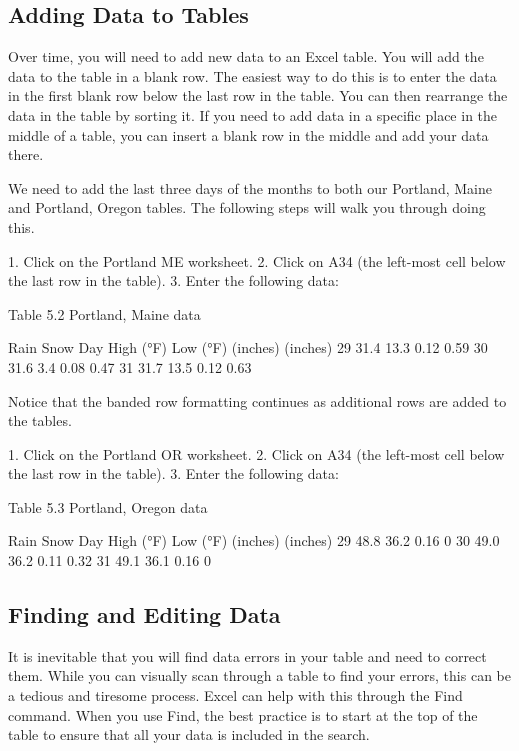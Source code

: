 \subsection{Adding Data to Tables}

Over time, you will need to add new data to an Excel table. You will add the data to the table in a blank
row. The easiest way to do this is to enter the data in the first blank row below the last row in the
table. You can then rearrange the data in the table by sorting it. If you need to add data in a specific
place in the middle of a table, you can insert a blank row in the middle and add your data there.

We need to add the last three days of the months to both our Portland, Maine and Portland, Oregon
tables. The following steps will walk you through doing this.

1. Click on the Portland ME worksheet.
2. Click on A34 (the left-most cell below the last row in the table).
3. Enter the following data:

Table 5.2 Portland, Maine data

Rain     Snow
Day High (°F) Low (°F)
(inches) (inches)
29    31.4       13.3       0.12       0.59
30    31.6       3.4        0.08       0.47
31    31.7       13.5       0.12       0.63




Notice that the banded row formatting continues as additional rows are added to the tables.

1. Click on the Portland OR worksheet.
2. Click on A34 (the left-most cell below the last row in the table).
3. Enter the following data:

Table 5.3 Portland, Oregon data



Rain     Snow
Day High (°F) Low (°F)
(inches) (inches)
29      48.8       36.2       0.16     0
30      49.0       36.2       0.11     0.32
31      49.1       36.1       0.16     0


\subsection{Finding and Editing Data}

It is inevitable that you will find data errors in your table and need to correct them. While you can
visually scan through a table to find your errors, this can be a tedious and tiresome process. Excel can
help with this through the Find command. When you use Find, the best practice is to start at the top
of the table to ensure that all your data is included in the search.

